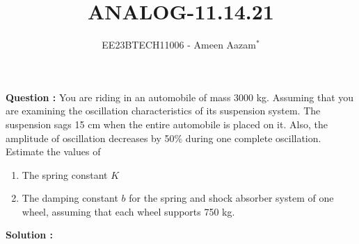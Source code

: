 \documentclass[journal,12pt,twocolumn]{IEEEtran}
\theoremstyle{remark}
\begin{document}

\vspace{3cm}

\title{ANALOG-11.14.21}
\author{EE23BTECH11006 - Ameen Aazam$^{*}$%
}
\maketitle
\newpage
\bigskip

\renewcommand{\thefigure}{\theenumi}
\renewcommand{\thetable}{\theenumi}


\vspace{3cm}
\textbf{Question :}
You are riding in an automobile of mass 3000 kg. Assuming that you are examining the oscillation characteristics of its suspension system. The suspension sags 15 cm when the entire automobile is placed on it. Also, the amplitude of oscillation decreases by 50\% during one complete oscillation. Estimate the values of
\begin{enumerate}[label=(\alph*)]
    \item The spring constant \( K \)
    \item The damping constant \( b \) for the spring and shock absorber system of one wheel, assuming that each wheel supports 750 kg.
\end{enumerate}
\textbf{Solution :}
\end{document}
